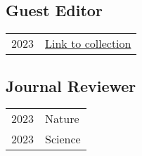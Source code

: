 

\subsection*{Guest Editor}
% 
\begin{longtable}[l]{@{}p{} p{}}


    2023 & \href{https://example.com}{Link to collection} \\

\end{longtable}


\subsection*{Journal Reviewer}
% 
\begin{longtable}[l]{@{}p{} p{}}

    2023 & Nature\\
    2023 & Science \\
    
\end{longtable}


